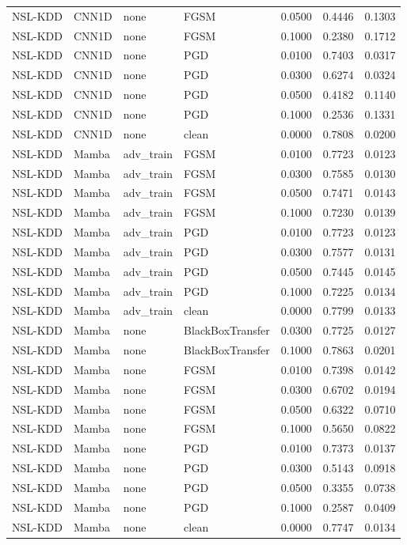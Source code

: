 \begin{table}[ht]
\begin{tabular}{llllrrr}
NSL-KDD & CNN1D & none & FGSM & 0.0500 & 0.4446 & 0.1303 \\
NSL-KDD & CNN1D & none & FGSM & 0.1000 & 0.2380 & 0.1712 \\
NSL-KDD & CNN1D & none & PGD & 0.0100 & 0.7403 & 0.0317 \\
NSL-KDD & CNN1D & none & PGD & 0.0300 & 0.6274 & 0.0324 \\
NSL-KDD & CNN1D & none & PGD & 0.0500 & 0.4182 & 0.1140 \\
NSL-KDD & CNN1D & none & PGD & 0.1000 & 0.2536 & 0.1331 \\
NSL-KDD & CNN1D & none & clean & 0.0000 & 0.7808 & 0.0200 \\
NSL-KDD & Mamba & adv\_train & FGSM & 0.0100 & 0.7723 & 0.0123 \\
NSL-KDD & Mamba & adv\_train & FGSM & 0.0300 & 0.7585 & 0.0130 \\
NSL-KDD & Mamba & adv\_train & FGSM & 0.0500 & 0.7471 & 0.0143 \\
NSL-KDD & Mamba & adv\_train & FGSM & 0.1000 & 0.7230 & 0.0139 \\
NSL-KDD & Mamba & adv\_train & PGD & 0.0100 & 0.7723 & 0.0123 \\
NSL-KDD & Mamba & adv\_train & PGD & 0.0300 & 0.7577 & 0.0131 \\
NSL-KDD & Mamba & adv\_train & PGD & 0.0500 & 0.7445 & 0.0145 \\
NSL-KDD & Mamba & adv\_train & PGD & 0.1000 & 0.7225 & 0.0134 \\
NSL-KDD & Mamba & adv\_train & clean & 0.0000 & 0.7799 & 0.0133 \\
NSL-KDD & Mamba & none & BlackBoxTransfer & 0.0300 & 0.7725 & 0.0127 \\
NSL-KDD & Mamba & none & BlackBoxTransfer & 0.1000 & 0.7863 & 0.0201 \\
NSL-KDD & Mamba & none & FGSM & 0.0100 & 0.7398 & 0.0142 \\
NSL-KDD & Mamba & none & FGSM & 0.0300 & 0.6702 & 0.0194 \\
NSL-KDD & Mamba & none & FGSM & 0.0500 & 0.6322 & 0.0710 \\
NSL-KDD & Mamba & none & FGSM & 0.1000 & 0.5650 & 0.0822 \\
NSL-KDD & Mamba & none & PGD & 0.0100 & 0.7373 & 0.0137 \\
NSL-KDD & Mamba & none & PGD & 0.0300 & 0.5143 & 0.0918 \\
NSL-KDD & Mamba & none & PGD & 0.0500 & 0.3355 & 0.0738 \\
NSL-KDD & Mamba & none & PGD & 0.1000 & 0.2587 & 0.0409 \\
NSL-KDD & Mamba & none & clean & 0.0000 & 0.7747 & 0.0134 \\
\bottomrule
\end{tabular}

\end{table}
